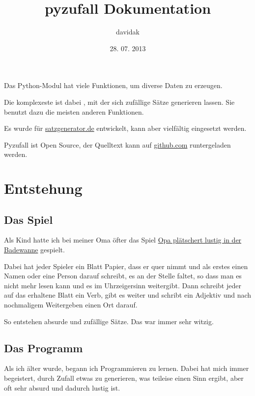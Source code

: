 \documentclass[a4paper,12pt,oneside]{sphinxmanual}
\title{pyzufall Dokumentation}
\date{28. 07. 2013}
\author{davidak}
\begin{document}
\maketitle
\tableofcontents
{}\label{index::doc}


Das Python-Modul {\hyperref[funktionen:module-pyzufall]{}} hat viele Funktionen, um diverse Daten zu erzeugen.

Die komplexeste ist dabei {\hyperref[funktionen:pyzufall.satz]{}}, mit der sich zufällige Sätze generieren lassen. Sie benutzt dazu die meisten anderen Funktionen.

Es wurde für \href{http://satzgenerator.de/}{satzgenerator.de} entwickelt, kann aber vielfältig eingesetzt werden.

Pyzufall ist Open Source, der Quelltext kann auf \href{https://github.com/davidak/pyzufall/}{github.com} runtergeladen werden.


\chapter{Entstehung}
\label{entstehung::doc}\label{entstehung:entstehung}\label{entstehung:dokumentation-von-pyzufall}

\section{Das Spiel}
\label{entstehung:das-spiel}
Als Kind hatte ich bei meiner Oma öfter das Spiel \href{http://www.mama-tipps.de/tipp/Opa-plaetschert-Badewanne.html}{Opa plätschert lustig in der Badewanne} gespielt.

Dabei hat jeder Spieler ein Blatt Papier, dass er quer nimmt und als erstes einen Namen oder eine Person darauf schreibt, es an der Stelle faltet, so dass man es nicht mehr lesen kann und es im Uhrzeigersinn weitergibt. Dann schreibt jeder auf das erhaltene Blatt ein Verb, gibt es weiter und schribt ein Adjektiv und nach nochmaligem Weitergeben einen Ort darauf.

So entstehen absurde und zufällige Sätze. Das war immer sehr witzig.


\section{Das Programm}
\label{entstehung:das-programm}
Als ich älter wurde, begann ich Programmieren zu lernen. Dabei hat mich immer begeistert, durch Zufall etwas zu generieren, was teileise einen Sinn ergibt, aber oft sehr absurd und dadurch lustig ist.
\end{document}
